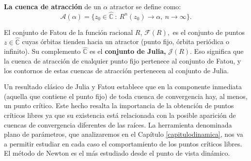 \textbf{La cuenca de atracción} de un $\alpha$ atractor se define como:
\[
\mathcal{A}\left( \alpha \right) =\{z_{0}\in \hat{\mathbb{C}} \ : \
R^{n}\left( z_{0}\right) {\rightarrow }\alpha, \ n{\rightarrow
}\infty \}.
\]

El conjunto de Fatou de la función racional $R$, $\mathcal{F}%
\left( R\right) ,$ es el conjunto de puntos $z \in \hat{\mathbb{C}}$
cuyas órbitas tienden hacia un atractor (punto fijo, órbita periódica o
infinito). Su complemento $\hat{\mathbb{C}}$ es el \textbf{conjunto de Julia,} $\mathcal{J}\left( R\right)$. Eso significa que la cuenca de atracción de cualquier punto fijo pertenece al conjunto de Fatou, y los contornos de estas cuencas de atracción pertenecen al conjunto de Julia.

Un resultado clásico de Julia y Fatou \cite{devaney} establece que en la componente inmediata (aquella que contiene el punto fijo) de toda cuenca de convergencia hay, al menos, un punto crítico. Este hecho resalta la importancia de la obtención de puntos críticos libres ya que su existencia está relacionada con la posible aparición de cuencas de convergencia diferentes de las raíces. La herramienta denominada plano de parámetros, que analizaremos en el Capítulo \ref{capitulodinamica}, nos va a permitir estudiar en cada caso el comportamiento de los puntos críticos libres. El método de Newton es el más estudiado desde el punto de vista dinámico.

